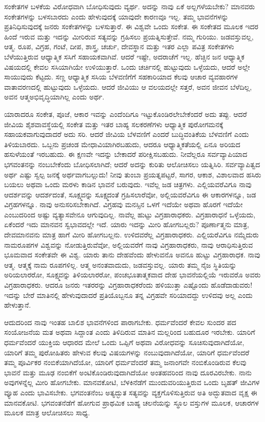 ಸಂಕೇತಗಳ ಬಳಕೆಯ ವಿರೋಧವಾಗಿ ಬೋಧಿಸುವುದು ವ್ಯರ್ಥ. ಅದನ್ನು ನಾವು ಏಕೆ ಅಲ್ಲಗಳೆಯಬೇಕು? ಮಾನವರು ಸಂಕೇತಗಳನ್ನು ಬಳಸಬಾರದು ಎಂದು ಹೇಳುವುದಕ್ಕೆ ಯಾವುದೇ ಕಾರಣವೂ ಇಲ್ಲ. ತಮ್ಮ ಭಾವನೆಗಳನ್ನು ಪ್ರತಿನಿಧಿಸುವುದಕ್ಕೆ ಜನರು ಸಂಕೇತಗಳನ್ನು ಬಳಸುತ್ತಾರೆ. ಈ ವಿಶ್ವವೇ ಒಂದು ಸಂಕೇತ. ಈ ಸಂಕೇತದ ಮೂಲಕ ಇದರ ಹಿಂದೆ ಇರುವ ಮತ್ತು ಇದನ್ನು ಮೀರಿರುವ ಸತ್ಯವನ್ನು ಗ್ರಹಿಸಲು ಪ್ರಯತ್ನಿಸುತ್ತೇವೆ. ನಮ್ಮ ಗುರಿಯು. ಜಡವಸ್ತುವಲ್ಲ, ಆತ್ಮ. ರೂಪ, ವಿಗ್ರಹ, ಗಂಟೆ, ದೀಪ, ಶಾಸ್ತ್ರ, ಚರ್ಚು, ದೇವಸ್ಥಾನ ಮತ್ತು ಇತರ ಎಲ್ಲಾ ಪವಿತ್ರ ಸಂಕೇತಗಳು ಬೆಳೆಯುತ್ತಿರುವ ಆಧ್ಯಾತ್ಮಿಕ ಸಸಿಗೆ ಸಹಾಯಕವಾಗಿವೆ. ಆದರೆ ಇಷ್ಟೇ, ಅದರಾಚೆಗೆ ಇಲ್ಲ. ಹೆಚ್ಚಿನ ಜನ ಆಧ್ಯಾತ್ಮಿಕ ವಿಷಯದಲ್ಲಿ ಕೇವಲ ಸಸಿಯಾಗಿಯೇ ಉಳಿಯುತ್ತಾರೆ. ಒಂದು ಚರ್ಚಿನಲ್ಲಿ ಹುಟ್ಟುವುದು ಒಳ್ಳೆಯದು, ಆದರೆ ಅಲ್ಲೇ ಸಾಯುವುದು ಕೆಟ್ಟದು. ಸಣ್ಣ ಆಧ್ಯಾತ್ಮಿಕ ಸಸಿಯ ಬೆಳವಣಿಗೆಗೆ ಸಹಕಾರಿಯಾದ ಕೆಲವು ಆಚಾರ ವ್ಯವಹಾರಗಳ ವಾತಾವರಣದಲ್ಲಿ ಹುಟ್ಟುವುದು ಒಳ್ಳೆಯದು. ಆದರೆ ಜೀವಿಯು ಆ ವಲಯದಲ್ಲೇ ಸತ್ತರೆ, ಅವನ ಜೀವನ ಬೆಳೆದಿಲ್ಲ, ಅವನ ಆತ್ಮ\break ಅಭಿವೃದ್ಧಿಯಾಗಿಲ್ಲ ಎಂದು ಅರ್ಥ.

ಯಾರಾದರೂ ಸಂಕೇತ, ಪೂಜೆ, ಆಕಾರ ಇವನ್ನು ಎಂದೆಂದಿಗೂ ಇಟ್ಟುಕೊಂಡಿರಲೇ\-ಬೇಕೆಂದರೆ ಅದು ತಪ್ಪು. ಆದರೆ ಜೀವಿಯ ಶೈಶವಾವಸ್ಥೆಯಲ್ಲಿ ಸಂಕೇತ ಮತ್ತು ಇತರ ಬಾಹ್ಯ ಸಲಕರಣೆಗಳು ಆಧ್ಯಾತ್ಮಿಕ ಪುರೋಗಮನಕ್ಕೆ ಸಹಾಯಕವಾಗುವುದಾದರೆ ಅದು ಸರಿ. ಆದರೆ ಜೀವಿಯ ಬೆಳವಣಿಗೆ ಎಂದರೆ ಬುದ್ಧಿವಂತಿಕೆಯ ಬೆಳವಣಿಗೆ ಎಂದು ತಿಳಿಯ\-ಬಾರದು. ಒಬ್ಬನು ಪ್ರಚಂಡ ಮೇಧಾವಿಯಾಗಿರಬಹುದು, ಆದರೂ ಆಧ್ಯಾತ್ಮಿಕತೆಯಲ್ಲಿ ಏನೂ ಅರಿಯದ ಹಸುಳೆಯಂತೆ ಇರಬಹುದು. ಈ ಕ್ಷಣವೇ ಇದನ್ನು ಬೇಕಾದರೆ ಪರೀಕ್ಷಿಸಬಹುದು. ನೀವೆಲ್ಲರೂ ಸರ್ವವ್ಯಾಪಿಯಾದ ಭಗವಂತನನ್ನು ನಂಬಬೇಕೆಂದು ಬೋಧಿಸಲಾಗಿದೆ; ಆದರೆ ಅದನ್ನು ಕುರಿತು ಆಲೋಚಿಸಲು ಯತ್ನಿಸಿರಿ. ಸರ್ವವ್ಯಾಪಿತ್ವದ ಅರ್ಥ ಎಷ್ಟು ಸ್ವಲ್ಪ ಜನಕ್ಕೆ ಅರ್ಥವಾಗಬಲ್ಲುದು! ನೀವು ತುಂಬಾ ಪ್ರಯತ್ನಪಟ್ಟರೆ, ಸಾಗರ, ಆಕಾಶ, ವಿಶಾಲವಾದ ಹಸಿರು ಬಯಲು ಅಥವಾ ಒಂದು ಮರಳು ಕಾಡಿನ ಭಾವನೆ ಬರುವುದು. ಇವೆಲ್ಲ ಜಡ ಚಿತ್ರಗಳು. ಎಲ್ಲಿಯವರೆವಿಗೂ ನಾವು ಆದರ್ಶವನ್ನು ಆದರ್ಶದಂತೆ, ಸೂಕ್ಷ್ಮವನ್ನು ಸೂಕ್ಷ್ಮದಂತೆ ಗ್ರಹಿಸಲಾರೆವೋ, ಅಲ್ಲಿಯವರೆವಿಗೂ ಈ ಆಕಾರಗಳನ್ನೂ, ಜಡ ವಿಗ್ರಹಗಳನ್ನೂ. ನಾವು ಅನುಸರಿಸಬೇಕಾಗಿದೆ. ವಿಗ್ರಹವು ಮನಸ್ಸಿನ ಒಳಗೆ ಇದೆಯೇ ಅಥವಾ ಹೊರಗೆ ಇದೆಯೇ ಎಂಬುದರಿಂದ ಅಷ್ಟು ವ್ಯತ್ಯಾಸವೇನೂ ಆಗುವುದಿಲ್ಲ. ನಾವೆಲ್ಲ ಹುಟ್ಟು ವಿಗ್ರಹಾರಾಧಕರು. ವಿಗ್ರಹಾರಾಧನೆ ಒಳ್ಳೆಯದು, ಏಕೆಂದರೆ ಇದು ಮಾನವನ ಸ್ವಭಾವದಲ್ಲೇ ಇದೆ. ಯಾರು ಇದನ್ನು ಮೀರಿ ಹೋಗಬಲ್ಲರು? ಪೂರ್ಣಾತ್ಮನು ಮಾತ್ರ, ದೇವಮಾನವನು ಮಾತ್ರ ಹಾಗೆ ಮೀರಿ ಹೋಗಬಲ್ಲನು. ಉಳಿದವರೆಲ್ಲ ವಿಗ್ರಹಾರಾಧಕರು. ಎಲ್ಲಿಯರೆವಿಗೂ ನಮ್ಮೆದುರು ನಾಮರೂಪಗಳ ವಿಶ್ವವನ್ನು ನೋಡುತ್ತಿರುವೆವೋ, ಅಲ್ಲಿಯವರೆಗೆ ನಾವು ವಿಗ್ರಹಾರಾಧಕರು, ನಾವು ಆರಾಧಿಸುತ್ತಿರುವ ಭೂಮವಾದ ಸಂಕೇತವೇ ಈ ವಿಶ್ವ. ಯಾರು ತಾನು ದೇಹವೆಂದು ಹೇಳುವನೊ ಅವನೂ ಹುಟ್ಟು ವಿಗ್ರಹಾರಾಧಕ. ನಾವು ಆತ್ಮ. ಆತ್ಮಕ್ಕೆ ನಾಮ ರೂಪಗಳಿಲ್ಲ. ಆತ್ಮ ಅನಂತವಾದುದು, ಜಡವಸ್ತುವಲ್ಲ. ಯಾರು ತಮ್ಮ ನೈಜ ಸ್ಥಿತಿಯನ್ನು ಅರಿಯಲಾರರೋ, ಸೂಕ್ಷ್ಮವನ್ನು ತಿಳಿಯಲಾರರೋ, ಪಂಚಭೂತಾತ್ಮಕವಾದ ದೇಹ ಭಾವನೆಯಲ್ಲಿಯೆ ಇರುವರೊ ಅವರು ವಿಗ್ರಹಾರಾಧಕರು. ಆದರೂ ಜನರು ಇತರರನ್ನು ವಿಗ್ರಹಾರಾಧಕರೆಂದು ಹಳಿಯುತ್ತಾ ಎಷ್ಟೊಂದು ಹೊಡೆದಾಡುವರು! ಇದನ್ನು ಬೇರೆ ಮಾತಿನಲ್ಲಿ ಹೇಳುವುದಾದರೆ ಪ್ರತಿಯೊಬ್ಬನೂ ತನ್ನ ವಿಗ್ರಹವೇ ಸರಿಯಾದದ್ದು ಉಳಿದವು ಅಲ್ಲ ಎಂದು ಹೇಳುತ್ತಾನೆ.

ಆದುದರಿಂದ ನಾವು ಇಂತಹ ಬಾಲಿಶ ಭಾವನೆಗಳಿಂದ ಪಾರಾಗಬೇಕು. ಧರ್ಮವೆಂದರೆ ಕೇವಲ ಸುಂದರ ಪದ ಸಂಯೋಜನೆಯ ಮತ ಅಥವಾ ಸಿದ್ದಾಂತ ಎಂದು ತಿಳಿದಿರುವ ಮಾತಿನ ಮಲ್ಲರಿಂದ ಬಹುದೂರ ಇರಬೇಕು. ಯಾರಿಗೆ ಧರ್ಮವೆಂದರೆ ಯುಕ್ತಿಯ ಆಧಾರದ ಮೇಲೆ ಒಂದು ಒಪ್ಪಿಗೆ ಅಥವಾ ವಿರೋಧವನ್ನು ಸೂಚಿಸುವುದಾಗಿದೆಯೋ, ಯಾರಿಗೆ ತಮ್ಮ ಪುರೋಹಿತರು ಹೇಳುವ ಕೆಲವು ವಿಷಯಗಳನ್ನು ನಂಬುವುದಾಗಿದೆಯೋ, ಯಾರಿಗೆ ಧರ್ಮವೆಂದರೆ ತಮ್ಮ ಪೂರ್ವಿಕರ ನಂಬಿಕೆಯಾಗಿದೆಯೋ, ಯಾರಿಗೆ ಧರ್ಮವೆಂದರೆ ತಮ್ಮ ಜನಾಂಗವೇ ನಂಬಿಕೊಂಡಿರುವ ಕೆಲವು ಭಾವನೆ ಮತ್ತು ಮೂಢ ನಂಬಿಕೆಗೆ ಅಂಟಿಕೊಂಡಿರುವುದಾಗಿದೆಯೋ ಅಂತಹವರಿಂದ ನಾವು ದೂರವಿರಬೇಕು. ನಾನು ಅವುಗಳನ್ನೆಲ್ಲ ಮೀರಿ ಹೋಗಬೇಕು. ಮಾನವಕೋಟಿ, ಬೆಳಕಿನೆಡೆಗೆ ಮುಂದುವರಿಯು\-ತ್ತಿರುವ ಒಂದು ಬೃಹತ್​ ಜೀವಿಗಳ ವ್ಯೂಹ ಎಂದು ಭಾವಿಸಬೇಕು. ಭಗವಂತನೆಂಬ ಅತ್ಯದ್ಭುತ ಸತ್ಯವನ್ನು ವ್ಯಕ್ತಗೊಳಿಸುತ್ತಿರುವ ಅತಿ ಅದ್ಭುತವಾದ ವೃಕ್ಷ ಈ ಮಾನವಕೋಟಿ. ಭಗವಂತನೆಡೆಗೆ ಹೋಗುವ ಪ್ರಾಥಮಿಕ ಬಾಹ್ಯ ಚಲನೆಯನ್ನು ಸ್ಥೂಲ ವಸ್ತುಗಳ ಮೂಲಕ, ಆಚಾರಗಳ ಮೂಲಕ ಮಾತ್ರ ಆಲೋಚಿಸಲು ಸಾಧ್ಯ.

